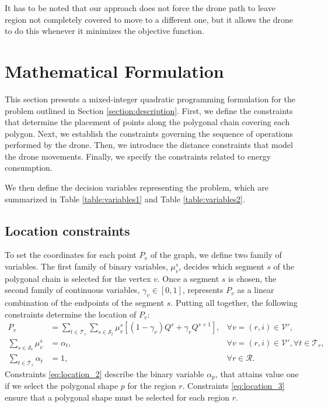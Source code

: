 \documentclass[12pt]{elsarticle}
\begin{document}
It has to be noted that our approach does not force the drone path to leave region not completely covered  to move to a different one, but it allows the drone to do this whenever it minimizes the objective function. 

\section{Mathematical Formulation}
This section presents a mixed-integer quadratic programming formulation for the problem outlined in Section \ref{section:description}. First, we define the constraints that determine the placement of points along the polygonal chain covering each polygon. Next, we establish the constraints governing the sequence of operations performed by the drone. Then, we introduce the distance constraints that model the drone movements. Finally, we specify the constraints related to energy consumption.

We then define the decision variables representing the problem, which are summarized in Table \ref{table:variables1} and Table \ref{table:variables2}.






\subsection{Location constraints}
To set the coordinates for each point $P_v$ of the graph, we define two family of variables. The first family of binary variables, $\mu_v^s$, decides which segment $s$ of the polygonal chain is selected for the vertex $v$. Once a segment $s$ is chosen, the second family of continuous variables, $\gamma_v\in [0,1]$, represents $P_v$ as a linear combination of the endpoints of the segment $s$. Putting all together, the following constraints determine the location of $P_v$:
\begin{align*}
    P_v&=\sum_{t\in\mathcal T_r} \sum_{s\in\mathcal S_t}\mu_{v}^s\left[(1-\gamma_v)Q^s+\gamma_v Q^{s+1}\right],&\forall v=(r,i)\in\mathcal V',\label{eq:location_1}\tag{$Loc-C_1$}\\
    \sum_{s\in\mathcal S_t}\mu_{v}^s&=\alpha_{t},&\forall v=(r,i)\in\mathcal V', \forall t \in \mathcal T_r,\label{eq:location_2}\tag{$Loc-C_2$}\\
    \sum_{t\in\mathcal T_r} \alpha_{t}&=1,&\forall r \in\mathcal R.\label{eq:location_3}\tag{$Loc-C_3$}
\end{align*}
Constraints \eqref{eq:location_2} describe the binary variable $\alpha_{p}$, that attains value one if we select the polygonal shape $p$ for the region $r$. Constraints \eqref{eq:location_3} ensure that a polygonal shape must be selected for each region $r$.
\end{document}
